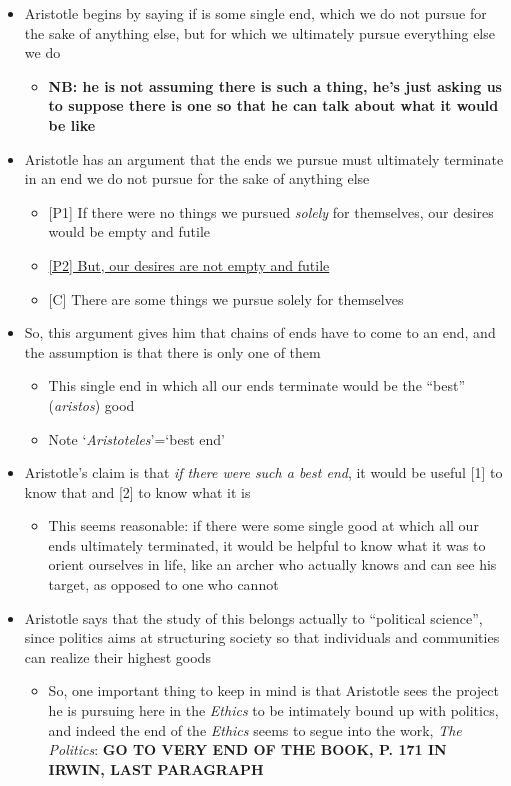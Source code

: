 \documentclass[11pt]{article}
\begin{document}
\begin{itemize}

\item{Aristotle begins by saying if is some single end, which we do not pursue for the sake of anything else, but for which we ultimately pursue everything else we do}\begin{itemize}\item{\textbf{NB: he is not assuming there is such a thing, he's just asking us to suppose there is one so that he can talk about what it would be like}}\end{itemize}

\item{Aristotle has an argument that the ends we pursue must ultimately terminate in an end we do not pursue for the sake of anything else}\begin{itemize}\item{[P1] If there were no things we pursued \emph{solely} for themselves, our desires would be empty and futile}\item{\underline{[P2] But, our desires are not empty and futile}}\item{[C] There are some things we pursue solely for themselves}\end{itemize}

\item{So, this argument gives him that chains of ends have to come to an end, and the assumption is that there is only one of them}\begin{itemize}\item{This single end in which all our ends terminate would be the ``best'' (\emph{aristos}) good}\item{Note `\emph{Aristoteles}'=`best end'}\end{itemize}

\item{Aristotle's claim is that \emph{if there were such a best end}, it would be useful [1] to know that and [2] to know what it is}\begin{itemize}\item{This seems reasonable: if there were some single good at which all our ends ultimately terminated, it would be helpful to know what it was to orient ourselves in life, like an archer who actually knows and can see his target, as opposed to one who cannot}\end{itemize}

\item{Aristotle says that the study of this belongs actually to ``political science'', since politics aims at structuring society so that individuals and communities can realize their highest goods}\begin{itemize}\item{So, one important thing to keep in mind is that Aristotle sees the project he is pursuing here in the \emph{Ethics} to be intimately bound up with politics, and indeed the end of the \emph{Ethics} seems to segue into the work, \emph{The Politics}: \textbf{GO TO VERY END OF THE BOOK, P. 171 IN IRWIN, LAST PARAGRAPH}}\end{itemize}

\end{itemize}
\end{document}
